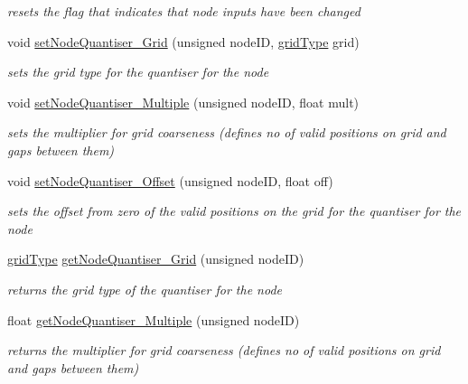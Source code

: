 \begin{DoxyCompactItemize}
\begin{DoxyCompactList}\small\item\em resets the flag that indicates that node inputs have been changed \end{DoxyCompactList}\item 
void \hyperlink{classMatsuokaEngine_aeb46c52bb2a430616aea63732aba7e32}{set\+Node\+Quantiser\+\_\+\+Grid} (unsigned node\+ID, \hyperlink{classQuantisedEventQueue_ae186d50bd503038452edbbdd0c7c259e}{grid\+Type} grid)
\begin{DoxyCompactList}\small\item\em sets the grid type for the quantiser for the node \end{DoxyCompactList}\item 
void \hyperlink{classMatsuokaEngine_a1220a5a72f9bf35a9e6cd5a4f999f7e5}{set\+Node\+Quantiser\+\_\+\+Multiple} (unsigned node\+ID, float mult)
\begin{DoxyCompactList}\small\item\em sets the multiplier for grid coarseness (defines no of valid positions on grid and gaps between them) \end{DoxyCompactList}\item 
void \hyperlink{classMatsuokaEngine_a12aafa189a6c9302937a00de6d291d42}{set\+Node\+Quantiser\+\_\+\+Offset} (unsigned node\+ID, float off)
\begin{DoxyCompactList}\small\item\em sets the offset from zero of the valid positions on the grid for the quantiser for the node \end{DoxyCompactList}\item 
\hyperlink{classQuantisedEventQueue_ae186d50bd503038452edbbdd0c7c259e}{grid\+Type} \hyperlink{classMatsuokaEngine_adce59f3e8b45ab4c0ca804b17d8eb749}{get\+Node\+Quantiser\+\_\+\+Grid} (unsigned node\+ID)
\begin{DoxyCompactList}\small\item\em returns the grid type of the quantiser for the node \end{DoxyCompactList}\item 
float \hyperlink{classMatsuokaEngine_a1d0b1a452f3d9252d460177779b2d681}{get\+Node\+Quantiser\+\_\+\+Multiple} (unsigned node\+ID)
\begin{DoxyCompactList}\small\item\em returns the multiplier for grid coarseness (defines no of valid positions on grid and gaps between them) \end{DoxyCompactList}\item 

\end{DoxyCompactItemize}
